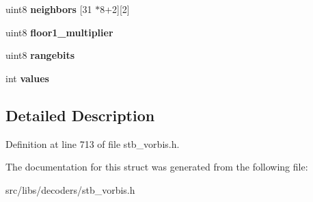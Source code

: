\begin{DoxyCompactItemize}
\item 
\hypertarget{structFloor1_a468a990afb1f3735d90992ec66a959d5}{uint8 {\bfseries neighbors} \mbox{[}31 $\ast$8+2\mbox{]}\mbox{[}2\mbox{]}}\label{structFloor1_a468a990afb1f3735d90992ec66a959d5}

\item 
\hypertarget{structFloor1_a38aa153cbf396cc55c05c67489965c73}{uint8 {\bfseries floor1\-\_\-multiplier}}\label{structFloor1_a38aa153cbf396cc55c05c67489965c73}

\item 
\hypertarget{structFloor1_a9edbc16be44c59b3374e7495c300098a}{uint8 {\bfseries rangebits}}\label{structFloor1_a9edbc16be44c59b3374e7495c300098a}

\item 
\hypertarget{structFloor1_a9a426cc6574076ad9e5d969a56af41f4}{int {\bfseries values}}\label{structFloor1_a9a426cc6574076ad9e5d969a56af41f4}

\end{DoxyCompactItemize}


\subsection{Detailed Description}


Definition at line 713 of file stb\-\_\-vorbis.\-h.



The documentation for this struct was generated from the following file\-:\begin{DoxyCompactItemize}
\item 
src/libs/decoders/stb\-\_\-vorbis.\-h\end{DoxyCompactItemize}
